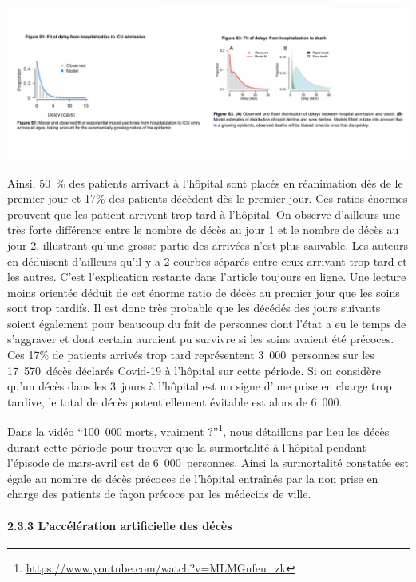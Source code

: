 \documentclass[
]{article}
\begin{document}
\includegraphics[width=10.41667in,height=\textheight]{data/images/fontanet.png}

Ainsi, 50~\% des patients arrivant à l'hôpital sont placés en
réanimation dès de le premier jour et 17\% des patients décèdent dès le
premier jour. Ces ratios énormes prouvent que les patient arrivent trop
tard à l'hôpital. On observe d'ailleurs une très forte différence entre
le nombre de décès au jour 1 et le nombre de décès au jour 2, illustrant
qu'une grosse partie des arrivées n'est plus sauvable. Les auteurs en
déduisent d'ailleurs qu'il y a 2 courbes séparés entre ceux arrivant
trop tard et les autres. C'est l'explication restante dans l'article
toujours en ligne. Une lecture moins orientée déduit de cet énorme ratio
de décès au premier jour que les soins sont trop tardifs. Il est donc
très probable que les décédés des jours suivants soient également pour
beaucoup du fait de personnes dont l'état a eu le temps de s'aggraver et
dont certain auraient pu survivre si les soins avaient été précoces. Ces
17\% de patients arrivés trop tard représentent 3~000~personnes sur les
17~570~décès déclarés Covid-19 à l'hôpital sur cette période. Si on
considère qu'un décès dans les 3~jours à l'hôpital est un signe d'une
prise en charge trop tardive, le total de décès potentiellement évitable
est alors de 6~000.

Dans la vidéo ``100~000 morts, vraiment ?''\footnote{\url{https://www.youtube.com/watch?v=MLMGnfeu_zk}},
nous détaillons par lieu les décès durant cette période pour trouver que
la surmortalité à l'hôpital pendant l'épisode de mars-avril est de
6~000~personnes. Ainsi la surmortalité constatée est égale au nombre de
décès précoces de l'hôpital entraînés par la non prise en charge des
patients de façon précoce par les médecins de ville.

\hypertarget{laccuxe9luxe9ration-artificielle-des-duxe9cuxe8s}{%
\paragraph{2.3.3 L'accélération artificielle des
décès}\label{laccuxe9luxe9ration-artificielle-des-duxe9cuxe8s}}
\end{document}
